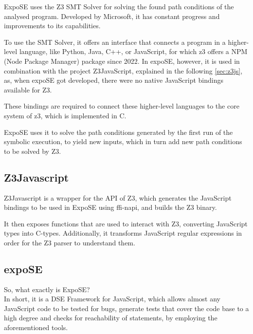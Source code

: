 ExpoSE uses the Z3 SMT Solver \cite{de_moura_z3_2008} for solving the found path conditions of the analysed program. Developed by Microsoft, it has constant progress and improvements to its capabilities.

To use the SMT Solver, it offers an interface that connects a program in a higher-level language, like Python, Java, C++, or JavaScript, for which z3 offers a NPM (Node Package Manager) package since 2022. In expoSE, however, it is used in combination with the project Z3JavaScript, explained in the following \autoref{sec:z3js}, as, when expoSE got developed, there were no native JavaScript bindings available for Z3. 

These bindings are required to connect these higher-level languages to the core system of z3, which is implemented in C.

ExpoSE uses it to solve the path conditions generated by the first run of the symbolic execution, to yield new inputs, which in turn add new path conditions to be solved by Z3. 






\subsection{Z3Javascript}
\label{sec:z3js}

Z3Javascript is a wrapper for the API of Z3, which generates the JavaScript bindings to be used in ExpoSE using ffi-napi, and builds the Z3 binary.

It then exposes functions that are used to interact with Z3, converting JavaScript types into C-types. 
Additionally, it transforms JavaScript regular expressions in order for the Z3 parser to understand them.






\newpage
\subsection{expoSE}
\label{sec:expose}
So, what exactly is ExpoSE? \\
In short, it is a DSE Framework for JavaScript, which allows almost any JavaScript code to be tested for bugs, generate tests that cover the code base to a high degree and checks for reachability of statements, by employing the aforementioned tools. \cite{loring_expose_2017}

